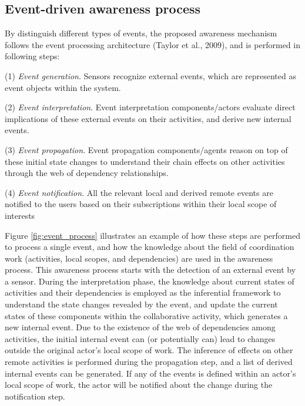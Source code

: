 
\subsection{Event-driven awareness process} %
\label{sub:event_driven_awareness_process}

By distinguish different types of events, the proposed awareness mechanism follows the event processing architecture (Taylor et al., 2009), and is performed in following steps: 

(1) \emph{Event generation}. Sensors recognize external events, which are represented as event objects within the system. 

(2) \emph{Event interpretation}. Event interpretation components/actors evaluate direct implications of these external events on their activities, and derive new internal events. 

(3) \emph{Event propagation}. Event propagation components/agents reason on top of these initial state changes to understand their chain effects on other activities through the web of dependency relationships. 

(4) \emph{Event notification}. All the relevant local and derived remote events are notified to the users based on their subscriptions within their local scope of interests 

Figure \ref{fig:event_process} illustrates an example of how these steps are performed to process a single event, and how the knowledge about the field of coordination work (activities, local scopes, and dependencies) are used in the awareness process. This awareness process starts with the detection of an external event by a sensor. During the interpretation phase, the knowledge about current states of activities and their dependencies is employed as the inferential framework to understand the state changes revealed by the event, and update the current states of these components within the collaborative activity, which generates a new internal event. Due to the existence of the web of dependencies among activities, the initial internal event can (or potentially can) lead to changes outside the original actor’s local scope of work. The inference of effects on other remote activities is performed during the propagation step, and a list of derived internal events can be generated. If any of the events is defined within an actor's local scope of work, the actor will be notified about the change during the notification step.

